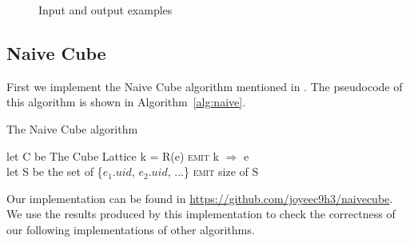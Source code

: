 \documentclass{article}
\begin{document}
\begin{figure}[h]
\centering
{}
\caption{Input and output examples}
\label{fig:example}
\end{figure}

\subsection{Naive Cube}

First we implement the Naive Cube algorithm mentioned in \cite{nandi2012data}. The pseudocode of this algorithm is shown in Algorithm~\ref{alg:naive}.

\begin{algorithm}[H]
\centering
\caption{The Naive Cube algorithm}
\label{alg:naive}
  \begin{algorithmic}[1]
      \State let C be The Cube Lattice
        	\State k = R(e)
        	\State \textsc{emit} k $\Rightarrow$ e
        \EndFor
      \EndFor
    \EndFunction
\\
      \State let S be the set of \{$e_{1}.uid$, $e_{2}.uid$, ...\}
      \State \textsc{emit} size of S
    \EndFunction
  \end{algorithmic}
\end{algorithm}

Our implementation can be found in \url{https://github.com/joyeec9h3/naivecube}. We use the results produced by this implementation to check the correctness of our following implementations of other algorithms.
\end{document}
